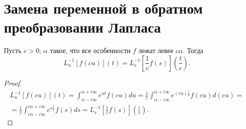 \documentclass[../paper.tex]{subfiles}
\begin{document}
\section{Замена переменной в обратном преобразовании Лапласа}
\begin{Th*}
Пусть $c>0$; $\alpha$ такое, что все особенности $f$ лежат левее $c\alpha$. Тогда
\[
    L^{-1}_u \left[ f(cu) \right](t) = L^{-1}_s \left[ \frac{1}{c}f(s) \right]\left(\frac{t}{c}\right)
.\]
\end{Th*}
\begin{proof}
\begin{multline*}
    L^{-1}_u\left[f\left(cu\right)\right](t) 
    = \int_{\alpha-i\infty}^{\alpha+i\infty} e^{ut}f(cu)du 
    = \frac{1}{c} \int_{\alpha-i\infty}^{\alpha+i\infty} e^{\left(cu\right) \frac{t}{c}} f(cu) d\left(cu\right)
=\\=
    \frac{1}{c} \int_{c\alpha-i\infty}^{c\alpha+i\infty} e^{s\frac{t}{c}} f(s) ds
    = L^{-1}_s \left[ \frac{1}{c} f(s) \right]\left( \frac{t}{c} \right)  
.\end{multline*}
\end{proof}
\end{document}
